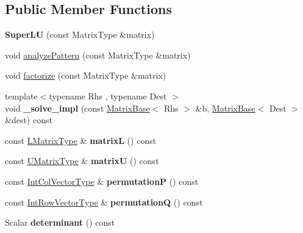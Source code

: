 \subsection*{Public Member Functions}
\begin{DoxyCompactItemize}
\item 
\mbox{\label{class_eigen_1_1_super_l_u_a31d051a622837afe71a5a12f9ca995a7}} 
{\bfseries Super\+LU} (const Matrix\+Type \&matrix)
\item 
void \mbox{\hyperlink{class_eigen_1_1_super_l_u_a493cdfada27415a6037b004ff974eace}{analyze\+Pattern}} (const Matrix\+Type \&matrix)
\item 
void \mbox{\hyperlink{class_eigen_1_1_super_l_u_a0b5a5fbda1a1f368003c7c01021a4636}{factorize}} (const Matrix\+Type \&matrix)
\item 
\mbox{\label{class_eigen_1_1_super_l_u_aff6428de2f43f9d90b640dc713dfd802}} 
{\footnotesize template$<$typename Rhs , typename Dest $>$ }\\void {\bfseries \+\_\+solve\+\_\+impl} (const \mbox{\hyperlink{class_eigen_1_1_matrix_base}{Matrix\+Base}}$<$ Rhs $>$ \&b, \mbox{\hyperlink{class_eigen_1_1_matrix_base}{Matrix\+Base}}$<$ Dest $>$ \&dest) const
\item 
\mbox{\label{class_eigen_1_1_super_l_u_a2b04928559e7dcf1a455a493fe8ca350}} 
const \mbox{\hyperlink{class_eigen_1_1_triangular_view}{L\+Matrix\+Type}} \& {\bfseries matrixL} () const
\item 
\mbox{\label{class_eigen_1_1_super_l_u_a5c848ddb3bd3edd1796f354bd69ac258}} 
const \mbox{\hyperlink{class_eigen_1_1_triangular_view}{U\+Matrix\+Type}} \& {\bfseries matrixU} () const
\item 
\mbox{\label{class_eigen_1_1_super_l_u_adf0826125fe13adc57506f4d0c9617c7}} 
const \mbox{\hyperlink{class_eigen_1_1_matrix}{Int\+Col\+Vector\+Type}} \& {\bfseries permutationP} () const
\item 
\mbox{\label{class_eigen_1_1_super_l_u_ad136353331d04ab8ae824c3f69513265}} 
const \mbox{\hyperlink{class_eigen_1_1_matrix}{Int\+Row\+Vector\+Type}} \& {\bfseries permutationQ} () const
\item 
\mbox{\label{class_eigen_1_1_super_l_u_ad2ccbf5b565c8dc5e7a0216a86e3662c}} 
Scalar {\bfseries determinant} () const
\end{DoxyCompactItemize}
